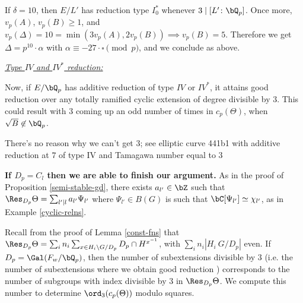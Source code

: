 If $\delta = 10$, then $E / L'$ has reduction type $I_0^*$ whenever $3 \mid [ L' \colon \bQ_p]$. Once more, $v_p(A)$, $v_p(B) \geq 1$, and $v_p(\Delta) = 10 = \min(3 v_p(A), 2 v_p(B)) \implies v_p(B) = 5$. Therefore we get $\Delta = p^{10} \cdot \alpha$ with $\alpha \equiv -27\cdot\square \pmod p$, and we conclude as above.

\vspace{1em}

\noindent\underline{\textit{Type $IV$ and $IV^*$ reduction:}}

Now, if $E /\bQ_p$ has additive reduction of type $IV$ or $IV^*$, it attains good reduction over any totally ramified cyclic extension of degree divisible by $3$. This could result with $3$ coming up an odd number of times in $c_p(\Theta)$, when $\sqrt{B} \not\in \bQ_p$. 
\begin{rem}
   There's no reason why we can't get 3; see elliptic curve 441b1 with additive reduction at $7$ of type IV and Tamagawa number equal to $3$
\end{rem}

\textbf{If $D_p = C_l$ then we are able to finish our argument.} As in the proof of Proposition \ref{semi-stable-gd}, there exists $a_{l'} \in \bZ$ such that $\Res_{D_p}\Theta = \sum_{l' \mid l} a_{l'} \Psi_{l'}$ where $\Psi_{l'} \in B(G)$ is such that $\bC[\Psi_{l'}] \simeq \chi_{l'}$, as in Example \ref{cyclic-relns}.

Recall from the proof of Lemma \ref{const-fns} that $\Res_{D_p} \Theta = \sum_i n_i \sum_{x \in H_i \backslash G / D_p} D_p \cap H^{x^{-1}}$, with $\sum_i n_i | H_i \ G / D_p|$ even. If $D_p = \Gal(F_w / \bQ_p)$, then the number of subextensions divisible by $3$ (i.e. the number of subextensions where we obtain good reduction ) corresponds to the number of subgroups with index divisible by $3$ in $\Res_{D_p}\Theta$. We compute this number to determine $\ord_3(c_p(\Theta))$ modulo squares.

